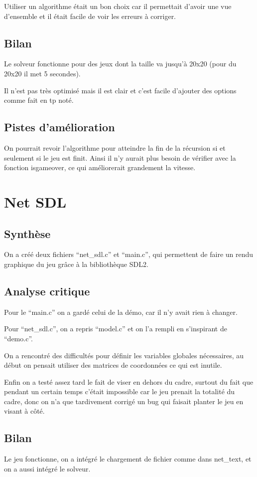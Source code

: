 \documentclass[12pt]{article}
\begin{document}
Utiliser un algorithme était un bon choix car il permettait d'avoir une vue d'ensemble et il était facile de voir les erreurs à corriger.
\subsection{Bilan}
Le solveur fonctionne pour des jeux dont la taille va jusqu'à 20x20 (pour du 20x20 il met 5 secondes).

Il n'est pas très optimisé mais il est clair et c'est facile d'ajouter des options comme fait en tp noté.
\subsection{Pistes d'amélioration}
On pourrait revoir l'algorithme pour atteindre la fin de la récursion si et seulement si le jeu est finit. Ainsi il n'y aurait plus besoin de vérifier avec la fonction isgameover, ce qui améliorerait grandement la vitesse.



\section{Net SDL}
\subsection{Synthèse}
On a créé deux fichiers ``net\_sdl.c'' et ``main.c'', qui permettent de faire un rendu graphique du jeu grâce à la bibliothèque SDL2.
\subsection{Analyse critique}
Pour le ``main.c'' on a gardé celui de la démo, car il n'y avait rien à changer.

Pour ``net\_sdl.c'', on a repris ``model.c'' et on l'a rempli en s'inspirant de ``demo.c''.

On a rencontré des difficultés pour définir les variables globales nécessaires, au début on pensait utiliser des matrices de coordonnées ce qui est inutile.

Enfin on a testé assez tard le fait de viser en dehors du cadre, surtout du fait que pendant un certain temps c'était impossible car le jeu prenait la totalité du cadre, donc on n'a que tardivement corrigé un bug qui faisait planter le jeu en visant  à côté.
\subsection{Bilan}
Le jeu fonctionne, on a intégré le chargement de fichier comme dans net\_text, et on a aussi intégré le solveur.
\end{document}
